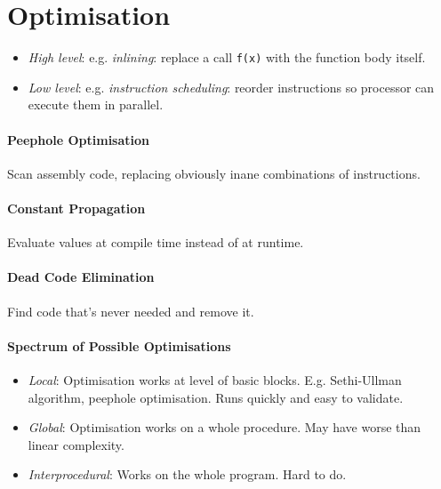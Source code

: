 \documentclass[twocolumn,english]{article}
\begin{document}
\section{Optimisation}
\begin{itemize}
\item \emph{High level}: e.g. \emph{inlining}: replace a call \texttt{f(x)}
with the function body itself.
\item \emph{Low level}: e.g. \emph{instruction scheduling}: reorder instructions
so processor can execute them in parallel.
\end{itemize}

\paragraph{Peephole Optimisation}

Scan assembly code, replacing obviously inane combinations of instructions.

\paragraph{Constant Propagation}

Evaluate values at compile time instead of at runtime.

\paragraph{Dead Code Elimination}

Find code that's never needed and remove it. 

\paragraph{Spectrum of Possible Optimisations}
\begin{itemize}
\item \emph{Local}: Optimisation works at level of basic blocks. E.g. Sethi-Ullman
algorithm, peephole optimisation. Runs quickly and easy to validate.
\item \emph{Global}: Optimisation works on a whole procedure. May have worse
than linear complexity.
\item \emph{Interprocedural}: Works on the whole program. Hard to do.
\end{itemize}
\end{document}
